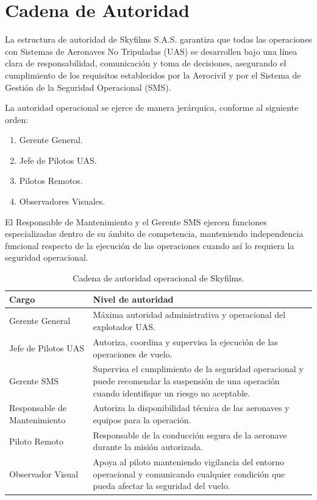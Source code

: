 \section{Cadena de Autoridad}

La estructura de autoridad de Skyfilms S.A.S. garantiza que todas las operaciones con Sistemas de Aeronaves No Tripuladas (UAS) se desarrollen bajo una línea clara de responsabilidad, comunicación y toma de decisiones, asegurando el cumplimiento de los requisitos establecidos por la Aerocivil y por el Sistema de Gestión de la Seguridad Operacional (SMS).

La autoridad operacional se ejerce de manera jerárquica, conforme al siguiente orden:

\begin{enumerate}
    \item Gerente General.
    \item Jefe de Pilotos UAS.
    \item Pilotos Remotos.
    \item Observadores Visuales.
\end{enumerate}

El Responsable de Mantenimiento y el Gerente SMS ejercen funciones especializadas dentro de su ámbito de competencia, manteniendo independencia funcional respecto de la ejecución de las operaciones cuando así lo requiera la seguridad operacional.





\begin{table}[H]
\centering
\renewcommand{\arraystretch}{1.3}
\begin{tabularx}{\textwidth}{|p{4cm}|X|}
\hline
\textbf{Cargo} & \textbf{Nivel de autoridad} \\ \hline

Gerente General &
Máxima autoridad administrativa y operacional del explotador UAS. \\ \hline

Jefe de Pilotos UAS &
Autoriza, coordina y supervisa la ejecución de las operaciones de vuelo. \\ \hline

Gerente SMS &
Supervisa el cumplimiento de la seguridad operacional y puede recomendar la suspensión de una operación cuando identifique un riesgo no aceptable. \\ \hline

Responsable de Mantenimiento &
Autoriza la disponibilidad técnica de las aeronaves y equipos para la operación. \\ \hline

Piloto Remoto &
Responsable de la conducción segura de la aeronave durante la misión autorizada. \\ \hline

Observador Visual &
Apoya al piloto manteniendo vigilancia del entorno operacional y comunicando cualquier condición que pueda afectar la seguridad del vuelo. \\ \hline

\end{tabularx}
\caption{Cadena de autoridad operacional de Skyfilms.}
\end{table}


